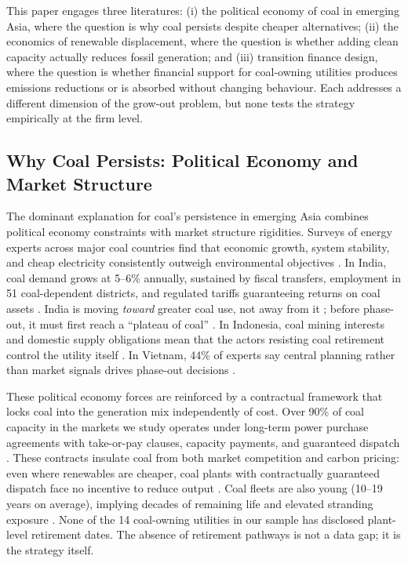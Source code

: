 \documentclass[review,3p,authoryear]{elsarticle}
\begin{document}
This paper engages three literatures: (i) the political economy of coal in emerging Asia, where the question is why coal persists despite cheaper alternatives; (ii) the economics of renewable displacement, where the question is whether adding clean capacity actually reduces fossil generation; and (iii) transition finance design, where the question is whether financial support for coal-owning utilities produces emissions reductions or is absorbed without changing behaviour. Each addresses a different dimension of the grow-out problem, but none tests the strategy empirically at the firm level.

\subsection{Why Coal Persists: Political Economy and Market Structure}

The dominant explanation for coal's persistence in emerging Asia combines political economy constraints with market structure rigidities. Surveys of energy experts across major coal countries find that economic growth, system stability, and cheap electricity consistently outweigh environmental objectives \citep{Ohlendorf2022}. In India, coal demand grows at 5--6\% annually, sustained by fiscal transfers, employment in 51 coal-dependent districts, and regulated tariffs guaranteeing returns on coal assets \citep{Chandra2025,Pai2021}. India is moving \textit{toward} greater coal use, not away from it \citep{Roy2021}; before phase-out, it must first reach a ``plateau of coal'' \citep{Tongia2020}. In Indonesia, coal mining interests and domestic supply obligations mean that the actors resisting coal retirement control the utility itself \citep{Ordonez2021}. In Vietnam, 44\% of experts say central planning rather than market signals drives phase-out decisions \citep{Do2023}.

These political economy forces are reinforced by a contractual framework that locks coal into the generation mix independently of cost. Over 90\% of coal capacity in the markets we study operates under long-term power purchase agreements with take-or-pay clauses, capacity payments, and guaranteed dispatch \citep{Boute2025}. These contracts insulate coal from both market competition and carbon pricing: even where renewables are cheaper, coal plants with contractually guaranteed dispatch face no incentive to reduce output \citep{Bodnar2020}. Coal fleets are also young (10--19 years on average), implying decades of remaining life and elevated stranding exposure \citep{Tong2019,Cui2019,Pfeiffer2016}. None of the 14 coal-owning utilities in our sample has disclosed plant-level retirement dates. The absence of retirement pathways is not a data gap; it is the strategy itself.
\end{document}
